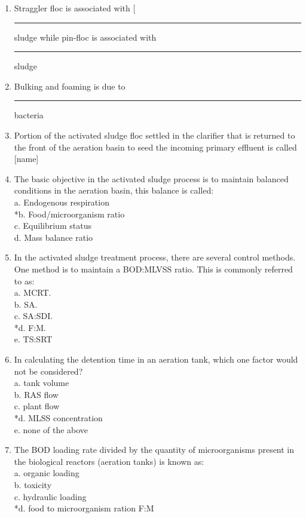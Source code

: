\begin{enumerate}
\item Straggler floc is associated with [\rule{1.5cm}{0.3mm} sludge while pin-floc is associated with \rule{1.5cm}{0.3mm} sludge \\
\item Bulking and foaming is due to \rule{1.5cm}{0.3mm}  bacteria \\

\item  Portion of the activated sludge floc settled in the clarifier that is returned to the front of the aeration basin to seed the incoming primary effluent is called [name] \\

\item The basic objective in the activated sludge process is to maintain balanced conditions in the aeration basin, this balance is called: \\
a. Endogenous respiration \\
*b. Food/microorganism ratio \\
c. Equilibrium status \\
d. Mass balance ratio \\

\item In the activated sludge treatment process, there are several control methods. One method is to maintain a BOD:MLVSS ratio. This is commonly referred to as: \\
a. MCRT. \\
b. SA. \\
c. SA:SDI. \\
*d. F:M. \\
e. TS:SRT \\

\item In calculating the detention time in an aeration tank, which one factor would not be considered? \\
a. tank volume \\
b. RAS flow \\
c. plant flow \\
*d. MLSS concentration \\
e. none of the above \\

\item The BOD loading rate divided by the quantity of microorganisms present in the biological reactors (aeration tanks) is known as: \\
a. organic loading \\
b. toxicity \\
c. hydraulic loading \\
*d. food to microorganism ration F:M \\


\end{enumerate}
